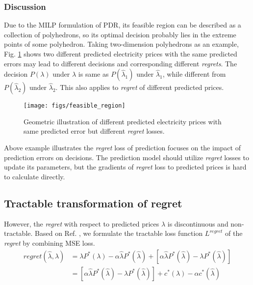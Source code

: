\documentclass[journal]{IEEEtran}
\begin{document}
\subsubsection{Discussion}
Due to the MILP formulation of PDR, its feasible region can be described as a collection of polyhedrons, so its optimal decision probably lies in the extreme points of some polyhedron. Taking two-dimension polyhedrons as an example, Fig. \ref{Feasible} shows two different predicted electricity prices with the same predicted errors may lead to different decisions and corresponding different \textit{regrets}. The decision $P(\lambda)$ under $\lambda$ is same as $P(\hat{\lambda}_1)$ under $\hat{\lambda}_1$, while different from $P(\hat{\lambda}_2)$ under $\hat{\lambda}_2$. This also applies to \textit{regret} of different predicted prices. 
\begin{figure}[ht]
  \centering
  \texttt{[image: figs/feasible\_region]}
  \caption{Geometric illustration of different predicted electricity prices with same predicted error but different \textit{regret} losses.}
  \label{Feasible}
\end{figure}

Above example illustrates the \textit{regret} loss of prediction focuses on the impact of prediction errors on decisions. The prediction model should utilize \textit{regret} losses to update its parameters, but the gradients of \textit{regret} loss to predicted prices is hard to calculate directly.

\subsection{Tractable transformation of regret}

However, the \textit{regret} with respect to predicted prices $\hat{\lambda}$ is discontinuous and non-tractable. Based on Ref. \cite{Elmachtoub2020}, we formulate the tractable loss function $L^{regret}$ of the \textit{regret} by combining MSE loss.
\begin{equation}
  \label{deductionofregret0}
  \begin{aligned}
    regret(\hat{\lambda}, \lambda) &= \lambda P^*(\lambda) - \alpha \hat{\lambda}P^*(\hat{\lambda}) + [\alpha \hat{\lambda}P^*(\hat{\lambda}) - \lambda P^*(\hat{\lambda})]\\
    &= [\alpha \hat{\lambda}P^*(\hat{\lambda}) - \lambda P^*(\hat{\lambda})] + c^*(\lambda) - \alpha c^*(\hat{\lambda})\\
  \end{aligned}
\end{equation}
\end{document}
